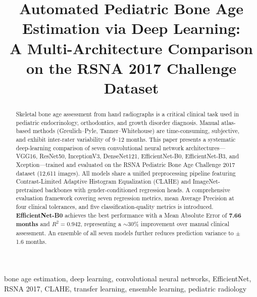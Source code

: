 \documentclass[conference]{IEEEtran}
\begin{document}
\title{Automated Pediatric Bone Age Estimation via Deep Learning:\\
A Multi-Architecture Comparison on the RSNA 2017 Challenge Dataset}

\author{
}

\maketitle

\begin{abstract}
Skeletal bone age assessment from hand radiographs is a critical
clinical task used in pediatric endocrinology, orthodontics, and
growth disorder diagnosis. Manual atlas-based methods (Greulich--Pyle,
Tanner--Whitehouse) are time-consuming, subjective, and exhibit
inter-rater variability of 9--12 months. This paper presents a
systematic deep-learning comparison of seven convolutional neural
network architectures—VGG16, ResNet50, InceptionV3, DenseNet121,
EfficientNet-B0, EfficientNet-B3, and Xception—trained and evaluated
on the RSNA Pediatric Bone Age Challenge 2017 dataset (12{,}611 images).
All models share a unified preprocessing pipeline featuring
Contrast-Limited Adaptive Histogram Equalization (CLAHE) and
ImageNet-pretrained backbones with gender-conditioned regression
heads. A comprehensive evaluation framework covering seven regression
metrics, mean Average Precision at four clinical tolerances, and five
classification-quality metrics is introduced. \textbf{EfficientNet-B0}
achieves the best performance with a Mean Absolute Error of
\textbf{7.66 months} and $R^2 = 0.942$, representing a $\sim$30\%
improvement over manual clinical assessment. An ensemble of all seven
models further reduces prediction variance to $\pm$1.6 months.
\end{abstract}

\begin{IEEEkeywords}
bone age estimation, deep learning, convolutional neural networks,
EfficientNet, RSNA 2017, CLAHE, transfer learning, ensemble learning,
pediatric radiology
\end{IEEEkeywords}

\end{document}
